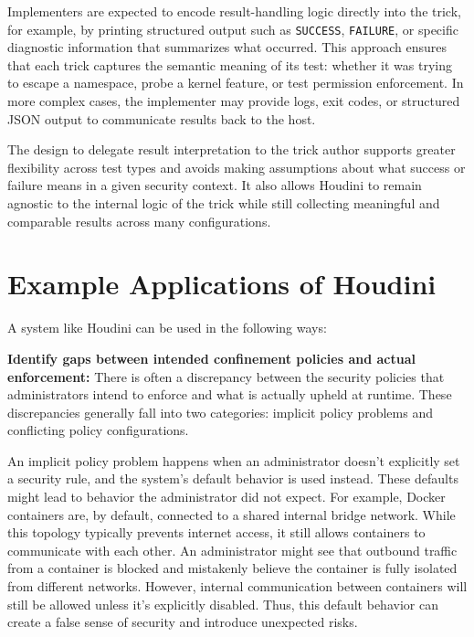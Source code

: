 \begin{doublespace}
Implementers are expected to encode result-handling logic directly into the trick, for example, by printing structured output such as \texttt{SUCCESS}, \texttt{FAILURE}, or specific diagnostic information that summarizes what occurred. This approach ensures that each trick captures the semantic meaning of its test: whether it was trying to escape a namespace, probe a kernel feature, or test permission enforcement. In more complex cases, the implementer may provide logs, exit codes, or structured JSON output to communicate results back to the host.

The design to delegate result interpretation to the trick author supports greater flexibility across test types and avoids making assumptions about what success or failure means in a given security context. It also allows Houdini to remain agnostic to the internal logic of the trick while still collecting meaningful and comparable results across many configurations. 

\section{Example Applications of Houdini}
A system like Houdini can be used in the following ways: 

\noindent\textbf{Identify gaps between intended confinement policies and actual enforcement:}
There is often a discrepancy between the security policies that administrators intend to enforce and what is actually upheld at runtime. These discrepancies generally fall into two categories: implicit policy problems and conflicting policy configurations.

An implicit policy problem happens when an administrator doesn't explicitly set a security rule, and the system's default behavior is used instead. These defaults might lead to behavior the administrator did not expect. For example, Docker containers are, by default, connected to a shared internal bridge network. While this topology typically prevents internet access, it still allows containers to communicate with each other. An administrator might see that outbound traffic from a container is blocked and mistakenly believe the container is fully isolated from different networks. However, internal communication between containers will still be allowed unless it's explicitly disabled. Thus, this default behavior can create a false sense of security and introduce unexpected risks.


\end{doublespace}
